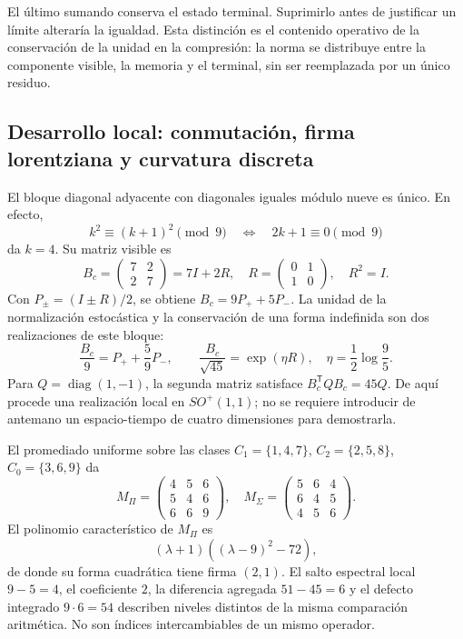 El último sumando conserva el estado terminal. Suprimirlo antes de justificar un límite alteraría la igualdad. Esta distinción es el contenido operativo de la conservación de la unidad en la compresión: la norma se distribuye entre la componente visible, la memoria y el terminal, sin ser reemplazada por un único residuo.

\subsection{Desarrollo local: conmutación, firma lorentziana y curvatura discreta}
\label{x_reciprocidad:vii:sec:bloque-compresion}
\label{x_reciprocidad:iv:extension-curvatura-mixta}

El bloque diagonal adyacente con diagonales iguales módulo nueve es único. En efecto,
\[
 k^2\equiv(k+1)^2\pmod9\quad\Longleftrightarrow\quad2k+1\equiv0\pmod9
\]
da \(k=4\). Su matriz visible es
\[
 B_c=\begin{pmatrix}7&2\\2&7\end{pmatrix}=7I+2R,
 \quad R=\begin{pmatrix}0&1\\1&0\end{pmatrix},\quad R^2=I.
\]
Con \(P_\pm=(I\pm R)/2\), se obtiene \(B_c=9P_++5P_-\). La unidad de la normalización estocástica y la conservación de una forma indefinida son dos realizaciones de este bloque:
\[
 \frac{B_c}{9}=P_++\frac59P_-,\qquad
 \frac{B_c}{\sqrt{45}}=\exp(\eta R),\quad\eta=\frac12\log\frac95.
\]
Para \(Q=\operatorname{diag}(1,-1)\), la segunda matriz satisface \(B_c^{\mathsf T}QB_c=45Q\). De aquí procede una realización local en \(SO^+(1,1)\); no se requiere introducir de antemano un espacio-tiempo de cuatro dimensiones para demostrarla.

El promediado uniforme sobre las clases \(C_1=\{1,4,7\}\), \(C_2=\{2,5,8\}\), \(C_0=\{3,6,9\}\) da
\[
 M_\Pi=\begin{pmatrix}4&5&6\\5&4&6\\6&6&9\end{pmatrix},\quad
 M_\Sigma=\begin{pmatrix}5&6&4\\6&4&5\\4&5&6\end{pmatrix}.
\]
El polinomio característico de \(M_\Pi\) es
\[
 (\lambda+1)((\lambda-9)^2-72),
\]
de donde su forma cuadrática tiene firma \((2,1)\). El salto espectral local \(9-5=4\), el coeficiente \(2\), la diferencia agregada \(51-45=6\) y el defecto integrado \(9\cdot6=54\) describen niveles distintos de la misma comparación aritmética. No son índices intercambiables de un mismo operador.

